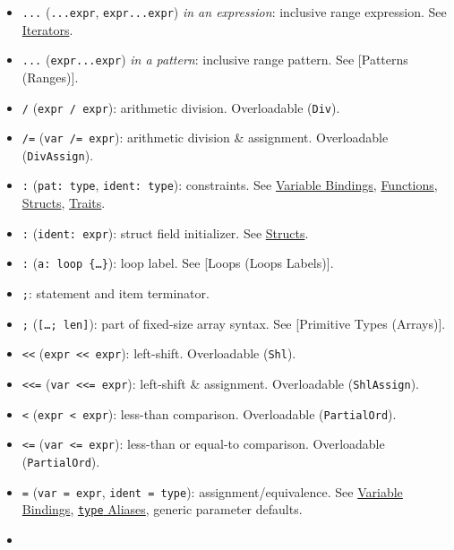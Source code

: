 \documentclass[a4paper,]{book}
\begin{document}
\begin{itemize}
\item
  \texttt{...} (\texttt{...expr}, \texttt{expr...expr}) \emph{in an
  expression}: inclusive range expression. See
  \protect\hyperlink{iterators}{Iterators}.
\item
  \texttt{...} (\texttt{expr...expr}) \emph{in a pattern}: inclusive
  range pattern. See {[}Patterns (Ranges){]}.
\item
  \texttt{/} (\texttt{expr\ /\ expr}): arithmetic division. Overloadable
  (\texttt{Div}).
\item
  \texttt{/=} (\texttt{var\ /=\ expr}): arithmetic division \&
  assignment. Overloadable (\texttt{DivAssign}).
\item
  \texttt{:} (\texttt{pat:\ type}, \texttt{ident:\ type}): constraints.
  See \protect\hyperlink{sec--variable-bindings}{Variable Bindings},
  \protect\hyperlink{functions}{Functions},
  \protect\hyperlink{sec--structs}{Structs},
  \protect\hyperlink{sec--traits}{Traits}.
\item
  \texttt{:} (\texttt{ident:\ expr}): struct field initializer. See
  \protect\hyperlink{sec--structs}{Structs}.
\item
  \texttt{:} (\texttt{\textquotesingle{}a:\ loop\ \{\ldots{}\}}): loop
  label. See {[}Loops (Loops Labels){]}.
\item
  \texttt{;}: statement and item terminator.
\item
  \texttt{;} (\texttt{{[}\ldots{};\ len{]}}): part of fixed-size array
  syntax. See {[}Primitive Types (Arrays){]}.
\item
  \texttt{\textless{}\textless{}}
  (\texttt{expr\ \textless{}\textless{}\ expr}): left-shift.
  Overloadable (\texttt{Shl}).
\item
  \texttt{\textless{}\textless{}=}
  (\texttt{var\ \textless{}\textless{}=\ expr}): left-shift \&
  assignment. Overloadable (\texttt{ShlAssign}).
\item
  \texttt{\textless{}} (\texttt{expr\ \textless{}\ expr}): less-than
  comparison. Overloadable (\texttt{PartialOrd}).
\item
  \texttt{\textless{}=} (\texttt{var\ \textless{}=\ expr}): less-than or
  equal-to comparison. Overloadable (\texttt{PartialOrd}).
\item
  \texttt{=} (\texttt{var\ =\ expr}, \texttt{ident\ =\ type}):
  assignment/equivalence. See
  \protect\hyperlink{sec--variable-bindings}{Variable Bindings},
  \protect\hyperlink{sec--type-aliases}{\texttt{type} Aliases}, generic
  parameter defaults.
\item

\end{itemize}
\end{document}
